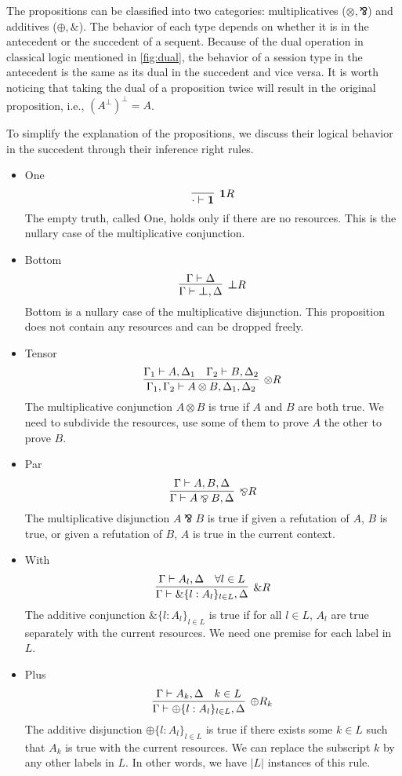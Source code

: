 \documentclass[12pt, openany]{memoir}
\newcommand*{\pare}[0]{\mathbin{\bindnasrepma}}
\begin{document}
The propositions can be classified into two categories: multiplicatives ($\otimes, \pare$) and additives ($\oplus, \&$). 
The behavior of each type depends on whether it is in the antecedent or the succedent of a sequent. 
Because of the dual operation in classical logic mentioned in \cref{fig:dual}, 
the behavior of a session type in the antecedent is the same as its dual in the succedent and vice versa. 
It is worth noticing that taking the dual of a proposition twice will result in the original proposition, i.e., ${(A^\bot)}^\bot = A$.

To simplify the explanation of the propositions, we discuss their logical behavior in the succedent through their inference right rules.
\begin{itemize}
  \item One
  \[
    \infer[\textbf{1}R]{\cdot \vdash \textbf{1}}{}
  \]
  The empty truth, called One, holds only if there are no resources. 
  This is the nullary case of the multiplicative conjunction.
  \item Bottom
  \[
    \infer[\boldsymbol{\bot} R]{\Gamma \vdash \boldsymbol{\bot}, \Delta}{
      \Gamma \vdash \Delta
    }
  \]
  Bottom is a nullary case of the multiplicative disjunction.
  This proposition does not contain any resources and can be dropped freely.
  \item Tensor
  \[
    \infer[\otimes R]{\Gamma_1, \Gamma_2 \vdash A \otimes B, \Delta_1, \Delta_2}{
      \Gamma_1 \vdash A, \Delta_1
      &
      \Gamma_2 \vdash B, \Delta_2
    }
  \]
  The multiplicative conjunction $A \otimes B$ is true if $A$ and $B$ are both true.
  We need to subdivide the resources, use some of them to prove $A$ the other to prove $B$. 
  \item Par
  \[
    \infer[\pare R]{\Gamma \vdash A \pare B, \Delta}{
      \Gamma \vdash A, B, \Delta
    }
  \]
  The multiplicative disjunction $A \pare B$ is true if given a refutation of $A$, $B$ is true,
  or given a refutation of $B$, $A$ is true in the current context.
  \item With
  \[
    \infer[\& R]{\Gamma \vdash \&\{l : A_l\}_{l \in L}, \Delta}{
      \Gamma \vdash A_l, \Delta
      &
      \forall l \in L
    }
  \]
  The additive conjunction $\&\{l : A_l\}_{l \in L}$ is true if for all $l \in L$, $A_l$ are true separately with the current resources.
  We need one premise for each label in $L$.
  \item Plus
  \[
    \infer[\oplus R_k]{\Gamma \vdash \oplus\{l : A_l\}_{l \in L}, \Delta}{
      \Gamma \vdash A_k, \Delta
      &
      k \in L
    }
  \]
  The additive disjunction $\oplus\{l : A_l\}_{l \in L}$ is true if there exists some $k \in L$ such that $A_k$ is true with the current resources.
  We can replace the subscript $k$ by any other labels in $L$. In other words, we have $|L|$ instances of this rule.
\end{itemize}
\end{document}
